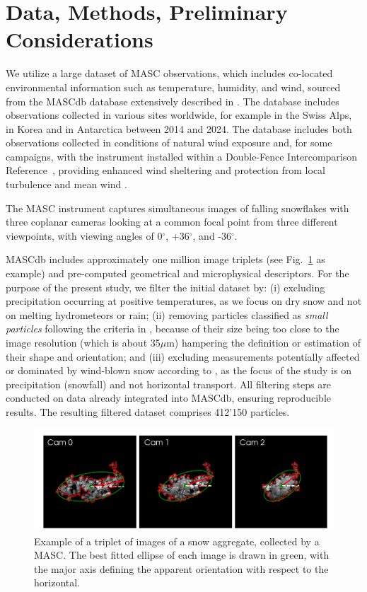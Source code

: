 \documentclass[draft]{agujournal2019}
\begin{document}
 
\section{Data, Methods, Preliminary Considerations}

We utilize a large dataset of MASC observations, which includes co-located environmental information such as temperature, humidity, and wind, sourced from the MASCdb database extensively described in \cite{Grazioli_SD_2022}. The database includes observations collected in various sites worldwide, for example in the Swiss Alps, in Korea and in Antarctica between 2014 and 2024. The database includes both observations collected in conditions of natural wind exposure and, for some campaigns, with the instrument installed within a Double-Fence Intercomparison Reference~\cite<DFIR, see for example>{Smith_HESS_2020}, providing enhanced wind sheltering and protection from local turbulence and mean wind . 

The MASC instrument captures simultaneous images of falling snowflakes with three coplanar cameras looking at a common focal point from three different viewpoints, with viewing angles of 0$^\circ$, +36$^\circ$, and -36$^\circ$.

MASCdb includes approximately one million image triplets (see Fig.~\ref{fig:triplet} as example) and pre-computed geometrical and microphysical descriptors. For the purpose of the present study, we filter the initial dataset by: (i) excluding precipitation occurring at positive temperatures, as we focus on dry snow and not on melting hydrometeors or rain; (ii) removing particles classified as \textit{small particles} following the criteria in \cite{Praz_AMT_2017}, because of their size being too close to the image resolution (which is about 35$\mu$m) hampering the definition or estimation of their shape and orientation; and (iii) excluding measurements potentially affected or dominated by wind-blown snow according to \cite{Schaer_TC_2020}, as the focus of the study is on precipitation (snowfall) and not horizontal transport. All filtering steps are conducted on data already integrated into MASCdb, ensuring reproducible results. The resulting filtered dataset comprises 412'150 particles.

\begin{figure}
 \noindent\includegraphics[width=\textwidth]{Fig01.png}
\caption{Example of a triplet of images of a snow aggregate, collected by a MASC. The best fitted ellipse of each image is drawn in green, with the major axis defining the apparent orientation with respect to the horizontal.    }
\label{fig:triplet}
\end{figure}
\end{document}
